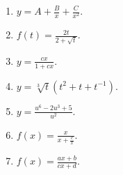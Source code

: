 \begin{problem}
\begin{multicols}{2}
\begin{enumerate}
\answer{$ $}
\item $y=A+\frac{B}x +\frac{C}{x^2}$.

\answer{$ $}
\item $f(t)=\frac{2t}{2+\sqrt{t}}$.

\answer{$ $}
\item $y=\frac{c x}{1+c x}$.

\answer{$ $}
\item $y=\sqrt[3]{t}(t^2+t+t^{-1}) $.

\answer{$ $}
\item $y=\frac{u^6-2u^3+5}{u^2}$.

\answer{$ $}
\item $f(x)=\frac{x}{x+\frac{c}{x}}$.

\answer{$ $}
\item $f(x)=\frac{a x+b}{c x+ d}$.

\answer{$ $}
\end{enumerate}
\end{multicols}
\end{problem}